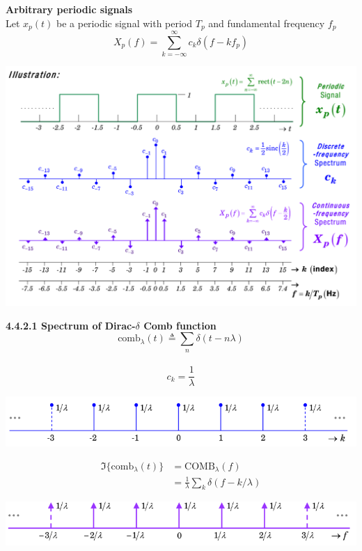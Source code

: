 \documentclass[6pt,landscape,a4paper]{extarticle}
\newenvironment{Figure}
  {\par\medskip\noindent\minipage{\linewidth}}
  {\endminipage\par\medskip}
\begin{document}
\begin{multicols*}{5}
\begin{Figure}
    \end{Figure}
    \textbf{Arbitrary periodic signals}\\
    Let $x_p(t)$ be a periodic signal with period $T_p$ and fundamental frequency $f_p$
    \[
        X_p(f)=\sum_{k=-\infty}^{\infty}c_k\delta (f-kf_p) \tag{4.16} 
    \]
    \begin{Figure}
        \centering
        \includegraphics[width=\linewidth]{images/continuousFreqSpectrum_periodic.png}
    \end{Figure}
    \textbf{4.4.2.1 Spectrum of Dirac-$\delta$ Comb function}\\
    \[
        \text{comb}_\lambda(t) \triangleq \sum_n\delta(t-n\lambda)
    \]\\
    \[
        c_k=\frac{1}{\lambda}
    \]
    \begin{Figure}
        \centering
        \includegraphics[width=\linewidth]{images/discreteFreqSpec_comb.png}
    \end{Figure}
    \begin{align*}
        \Im\{\text{comb}_\lambda(t)\} &= \text{COMB}_\lambda(f)\\
        &=\frac{1}{\lambda}\sum_k\delta(f-k/\lambda)
    \end{align*}
    \begin{Figure}
        \centering
        \includegraphics[width=\linewidth]{images/continuousFreqSpectrum_comb.png}
    \end{Figure}
    

\end{multicols*}
\end{document}

